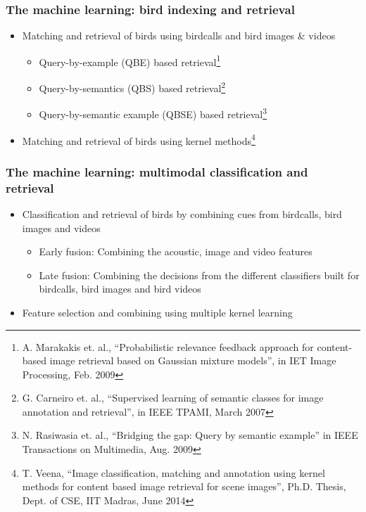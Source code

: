 \documentclass[mathserif]{beamer}
\begin{document}
\begin{frame}
\frametitle{The machine learning: bird indexing and retrieval}
\begin{itemize}
\item<2-> Matching and retrieval of birds using birdcalls and bird images \& videos
\begin{itemize}
      \item Query-by-example (QBE) based retrieval\footnote{
	A. Marakakis et. al., ``Probabilistic relevance feedback approach for content-based image retrieval based on Gaussian mixture models'', in IET Image Processing, Feb. 2009}
      \item Query-by-semantics (QBS) based retrieval\footnote{
	G. Carneiro et. al., ``Supervised learning of semantic classes for image annotation and retrieval'', in IEEE TPAMI, March 2007}
      \item Query-by-semantic example (QBSE) based retrieval\footnote{
	N. Rasiwasia et. al., ``Bridging the gap: Query by semantic example'' in IEEE Transactions on Multimedia, Aug. 2009}
\end{itemize}
\item<3-> Matching and retrieval of birds using kernel methods\footnote{
	T. Veena, ``Image classification, matching and annotation using kernel methods for content based image retrieval for scene images'', Ph.D. Thesis, Dept. of CSE, IIT Madras, June 2014}   
\end{itemize}
\end{frame}

\begin{frame}
\frametitle{The machine learning: multimodal classification and retrieval}
\begin{itemize}
\item<2-> Classification and retrieval of birds by combining cues from
birdcalls, bird images and videos
\begin{itemize}
      \item Early fusion: Combining the acoustic, image and video features
      \item Late fusion: Combining the decisions from the different classifiers built for birdcalls, bird images and bird videos
 \end{itemize}
\item<3-> Feature selection and combining using multiple kernel learning
\end{itemize}
\end{frame}
\end{document}
